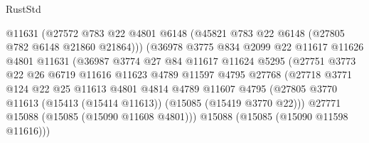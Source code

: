 \begin{lexlean}{RustStd}
\begin{coremodule}
                                  @11631
                                  (@27572
                                    @783
                                    @22
                                    @4801
                                    @6148
                                    (@45821 @783 @22 @6148 (@27805 @782 @6148 @21860 @21864)))
                                  (@36978
                                    @3775
                                    @834
                                    @2099
                                    @22
                                    @11617
                                    @11626
                                    @4801
                                    @11631
                                    (@36987
                                      @3774
                                      @27
                                      @84
                                      @11617
                                      @11624
                                      @5295
                                      (@27751
                                        @3773
                                        @22
                                        @26
                                        @6719
                                        @11616
                                        @11623
                                        @4789
                                        @11597
                                        @4795
                                        @27768
                                        (@27718
                                          @3771
                                          @124
                                          @22
                                          @25
                                          @11613
                                          @4801
                                          @4814
                                          @4789
                                          @11607
                                          @4795
                                          (@27805
                                            @3770
                                            @11613
                                            (@15413 (@15414 @11613))
                                            (@15085 (@15419 @3770 @22)))
                                          @27771
                                          @15088
                                          (@15085 (@15090 @11608 @4801)))
                                        @15088
                                        (@15085 (@15090 @11598 @11616)))

\end{coremodule}
\end{lexlean}
